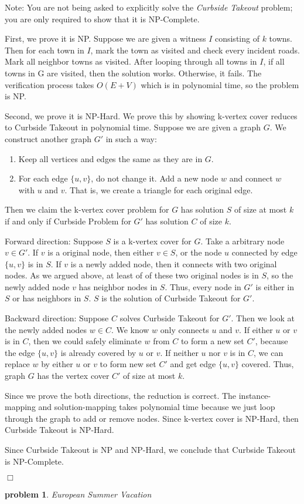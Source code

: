 \documentclass[10pt]{article}
\newenvironment{proof}{\par\noindent{\it Proof.}\hspace*{1em}}{$\Box$\bigskip}
\newtheorem{problem}{\sc\color{cit}problem}
\newcommand{\points}[1]{\normalfont{[#1 points]}}
\begin{document}
Note: You are not being asked to explicitly solve the \emph{Curbside Takeout} problem; you are only required to show that it is NP-Complete.
\begin{proof}
First, we prove it is NP. Suppose we are given a witness $I$ consisting of $k$ towns. Then for each town in $I$, mark the town as visited and check every incident roads. Mark all neighbor towns as visited. After looping through all towns in $I$, if all towns in G are visited, then the solution works. Otherwise, it fails. The verification process takes $O(E+V)$ which is in polynomial time, so the problem is NP.

Second, we prove it is NP-Hard. We prove this by showing k-vertex cover reduces to Curbside Takeout in polynomial time. Suppose we are given a graph $G$. We construct another graph $G'$ in such a way: 
\begin{enumerate}
    \item Keep all vertices and edges the same as they are in $G$.
    \item For each edge $\{u, v\}$, do not change it. Add a new node $w$ and connect $w$ with $u$ and $v$. That is, we create a triangle for each original edge.
\end{enumerate}
Then we claim the k-vertex cover problem for $G$ has solution $S$ of size at most $k$ if and only if Curbside Problem for $G'$ has solution $C$ of size $k$.

Forward direction: Suppose $S$ is a k-vertex cover for $G$. Take a arbitrary node $v \in G'$. If $v$ is a original node, then either $v \in S$, or the node $u$ connected by edge $\{u, v\}$ is in $S$. If $v$ is a newly added node, then it connects with two original nodes. As we argued above, at least of of these two original nodes is in $S$, so the newly added node $v$ has neighbor nodes in $S$. Thus, every node in $G'$ is either in $S$ or has neighbors in $S$. $S$ is the solution of Curbside Takeout for $G'$.

Backward direction: Suppose $C$ solves Curbside Takeout for $G'$. Then we look at the newly added nodes $w \in C$. We know $w$ only connects $u$ and $v$. If either $u$ or $v$ is in $C$, then we could safely eliminate $w$ from $C$ to form a new set $C'$, because the edge $\{u, v\}$ is already covered by $u$ or $v$. If neither $u$ nor $v$ is in $C$, we can replace $w$ by either $u$ or $v$ to form new set $C'$ and get edge $\{u, v\}$ covered. Thus, graph $G$ has the vertex cover $C'$ of size at most $k$.

Since we prove the both directions, the reduction is correct. The instance-mapping and solution-mapping takes polynomial time because we just loop through the graph to add or remove nodes. Since k-vertex cover is NP-Hard, then Curbside Takeout is NP-Hard.

Since Curbside Takeout is NP and NP-Hard, we conclude that Curbside Takeout is NP-Complete.

\end{proof}
\begin{problem} European Summer Vacation \points{20}\end{problem}
\end{document}
